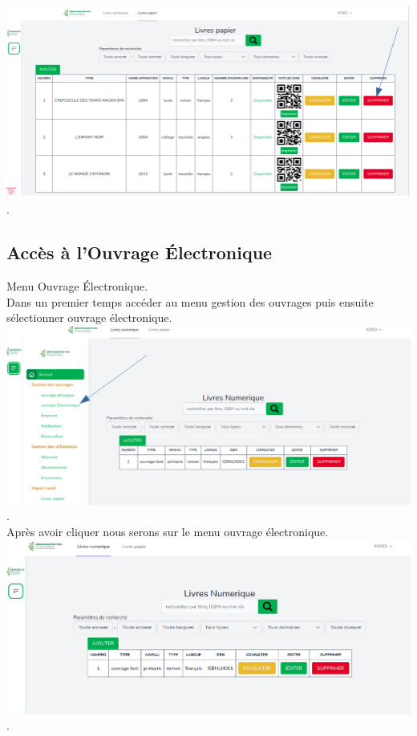 \documentclass[12pt,a4paper]{article}
\begin{document}
\includegraphics[scale=0.5]{images/ResulSuppression.png}.\\

\newpage
\subsection{Accès à l'Ouvrage Électronique}
Menu Ouvrage Électronique.\\
Dans un premier temps accéder au menu gestion des ouvrages puis ensuite sélectionner ouvrage électronique.\\
\includegraphics[scale=0.4]{images/OuVELectro.png}.\\

Après avoir cliquer nous serons sur le menu ouvrage électronique.\\

\includegraphics[scale=0.4]{images/TashBoardElectro.png}.\\
\end{document}
